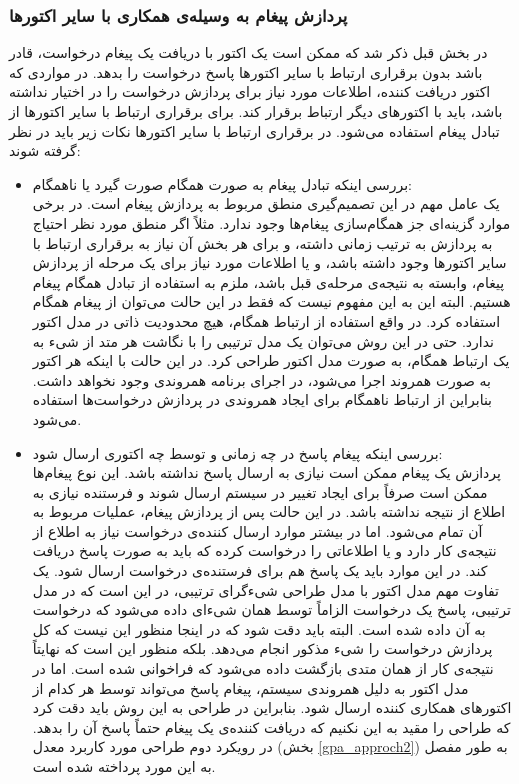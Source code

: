 \subsubsection{پردازش پیغام به وسیله‌ی همکاری با سایر اکتورها}
در بخش قبل ذکر شد که ممکن است یک اکتور با دریافت یک پیغام درخواست، قادر باشد بدون برقراری ارتباط با سایر اکتورها پاسخ درخواست را بدهد. در مواردی که اکتور دریافت کننده، اطلاعات مورد نیاز برای پردازش درخواست را در اختیار نداشته باشد، باید با اکتورهای دیگر ارتباط برقرار کند. برای برقراری ارتباط با سایر اکتورها از تبادل پیغام استفاده می‌شود. در برقراری ارتباط با سایر اکتورها نکات زیر باید در نظر گرفته شوند:\\
\begin{itemize}
\item بررسی اینکه تبادل پیغام به صورت همگام صورت گیرد یا ناهمگام:\\
یک عامل مهم در این تصمیم‌گیری منطق مربوط به پردازش پیغام است. در برخی موارد گزینه‌ای جز همگام‌سازی پیغام‌ها وجود ندارد. مثلاً اگر منطق مورد نظر احتیاج به پردازش به ترتیب زمانی داشته، و برای هر بخش آن نیاز به برقراری ارتباط با سایر اکتورها وجود داشته باشد، و یا  اطلاعات مورد نیاز برای یک مرحله از پردازش پیغام، وابسته به نتیجه‌ی مرحله‌ی قبل باشد، ملزم به استفاده از تبادل همگام پیغام هستیم. البته این به این مفهوم نیست که فقط در این حالت می‌توان از پیغام همگام استفاده کرد. در واقع استفاده از ارتباط همگام، هیچ محدودیت ذاتی در مدل اکتور ندارد. حتی در این روش می‌توان یک مدل ترتیبی را با نگاشت هر متد از شیء به یک ارتباط همگام، به صورت مدل اکتور طراحی کرد. در این حالت با اینکه هر اکتور به صورت همروند اجرا می‌شود، در اجرای برنامه همروندی وجود نخواهد داشت.
بنابراین از ارتباط ناهمگام برای ایجاد همروندی در پردازش درخواست‌ها استفاده می‌شود.
\item بررسی اینکه پیغام پاسخ در چه زمانی و توسط چه اکتوری ارسال شود:\\
پردازش یک پیغام ممکن است نیازی به ارسال پاسخ نداشته باشد. این نوع پیغام‌ها ممکن است صرفاً برای ایجاد تغییر در سیستم ارسال شوند و فرستنده نیازی به اطلاع از نتیجه نداشته باشد. در این حالت پس از پردازش پیغام، عملیات مربوط به آن تمام می‌شود. اما در بیشتر موارد ارسال کننده‌ی درخواست نیاز به اطلاع از نتیجه‌ی کار دارد و یا اطلاعاتی را درخواست کرده که باید به صورت پاسخ دریافت کند. در این موارد باید یک پاسخ هم برای فرستنده‌ی درخواست ارسال شود. یک تفاوت مهم مدل اکتور با مدل طراحی شیءگرای ترتیبی،‌ در این است که در مدل ترتیبی، پاسخ یک درخواست الزاماً توسط همان شیءای داده می‌شود که درخواست به آن داده شده است. البته باید دقت شود که در اینجا منظور این نیست که کل پردازش درخواست را شیء مذکور انجام می‌دهد. بلکه منظور این است که نهایتاً نتیجه‌ی کار از همان متدی بازگشت داده می‌شود که فراخوانی شده است. اما در مدل اکتور به دلیل همروندی سیستم،‌ پیغام پاسخ می‌تواند توسط هر کدام از اکتورهای همکاری کننده ارسال شود. بنابراین در طراحی به این روش باید دقت کرد که طراحی را مقید به این نکنیم که دریافت کننده‌ی یک پیغام حتماً پاسخ‌ آن را بدهد. در رویکرد دوم طراحی مورد کاربرد معدل (بخش \ref{gpa_approch2}) به طور مفصل به این مورد پرداخته شده است.

\end{itemize}
